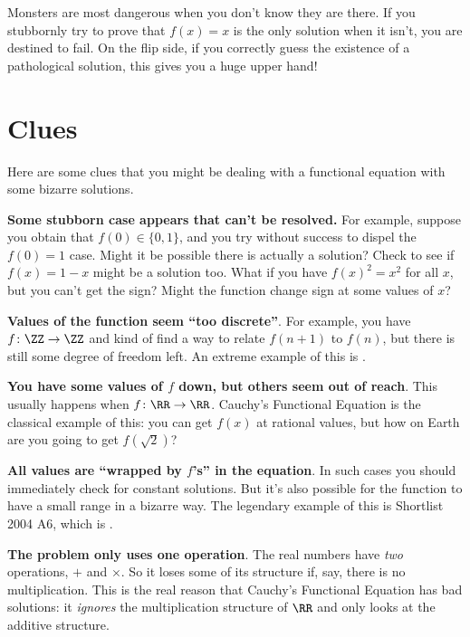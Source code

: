 \documentclass[11pt]{scrartcl}
\begin{document}
Monsters are most dangerous when you don't know they are there.
If you stubbornly try to prove that $f(x) = x$ is the only solution when it isn't,
you are destined to fail.
On the flip side, if you correctly guess the existence of a pathological solution,
this gives you a huge upper hand!

\section{Clues}
Here are some clues that you might be dealing with a
functional equation with some bizarre solutions.

\begin{itemize}
  \ii \textbf{Some stubborn case appears that can't be resolved.}
  For example, suppose you obtain that $f(0) \in \{0,1\}$,
  and you try without success to dispel the $f(0) = 1$ case.
  Might it be possible there is actually a solution?
  Check to see if $f(x) = 1-x$ might be a solution too.
  What if you have $f(x)^2 = x^2$ for all $x$, but you can't get the sign?
  Might the function change sign at some values of $x$?

  \ii \textbf{Values of the function seem ``too discrete''}.
  For example, you have $f \colon \ZZ \to \ZZ$ and kind of find a way to relate $f(n+1)$
  to $f(n)$, but there is still some degree of freedom left.
  An extreme example of this is .

  \ii \textbf{You have some values of $f$ down, but others seem out of reach}.
  This usually happens when $f \colon \RR \to \RR$.
  Cauchy's Functional Equation is the classical example of this:
  you can get $f(x)$ at rational values, but how on Earth are you going
  to get $f(\sqrt 2)$?

  \ii \textbf{All values are ``wrapped by $f$'s'' in the equation}.
  In such cases you should immediately check for constant solutions.
  But it's also possible for the function to have a small range
  in a bizarre way.
  The legendary example of this is Shortlist 2004 A6,
  which is .

  \ii \textbf{The problem only uses one operation}.
  The real numbers have \emph{two} operations, $+$ and $\times$.
  So it loses some of its structure if, say, there is no multiplication.
  This is the real reason that Cauchy's Functional Equation has bad solutions:
  it \emph{ignores} the multiplication structure of $\RR$
  and only looks at the additive structure.
\end{itemize}
\end{document}
